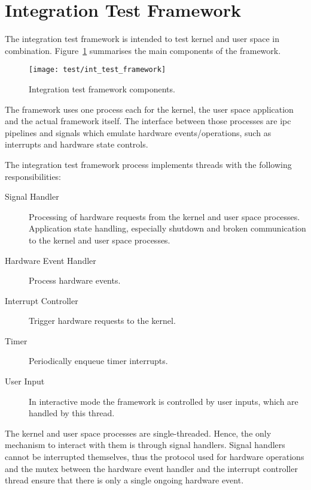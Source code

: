 %
%
%



\section{Integration Test Framework}
	The integration test framework is intended to test kernel and user space in combination. Figure~\ref{fig:int_test_framework} summarises the main components of the framework.

	\begin{figure}[h]
		\centering	
		\texttt{[image: test/int\_test\_framework]}
		\caption{Integration test framework components.}
		\label{fig:int_test_framework}
	\end{figure}

	The framework uses one process each for the kernel, the user space application and the actual framework itself. The interface between those processes are \gls{ipc} pipelines and signals which emulate hardware events/operations, such as interrupts and hardware state controls.

	The integration test framework process implements threads with the following responsibilities:
	\begin{description}
		\item[Signal Handler] Processing of hardware requests from the kernel and user space processes. Application state handling, especially shutdown and broken communication to the kernel and user space processes.

		\item[Hardware Event Handler] Process hardware events.
		\item[Interrupt Controller] Trigger hardware requests to the kernel.
		\item[Timer] Periodically enqueue timer interrupts.
		\item[User Input] In interactive mode the framework is controlled by user inputs, which are handled by this thread.
	\end{description}

	The kernel and user space processes are single-threaded. Hence, the only mechanism to interact with them is through signal handlers. Signal handlers cannot be interrupted themselves, thus the protocol used for hardware operations and the mutex between the hardware event handler and the interrupt controller thread ensure that there is only a single ongoing hardware event.

